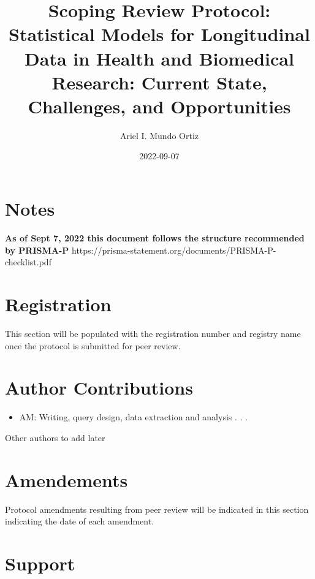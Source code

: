 \documentclass[
]{article}
\title{Scoping Review Protocol: Statistical Models for Longitudinal Data
in Health and Biomedical Research: Current State, Challenges, and
Opportunities}
\author{Ariel I. Mundo Ortiz}
\date{2022-09-07}
\providecommand{\tightlist}{%
  \setlength{\itemsep}{0pt}\setlength{\parskip}{0pt}}\usepackage{longtable,booktabs,array}
\renewcommand*\contentsname{Table of contents}
\newcommand\contentsname{Table of contents}
\begin{document}
\maketitle
\ifdefined\Shaded\renewenvironment{Shaded}{\begin{tcolorbox}[borderline west={3pt}{0pt}{shadecolor}, frame hidden, interior hidden, enhanced, breakable, sharp corners, boxrule=0pt]}{\end{tcolorbox}}\fi

\renewcommand*\contentsname{Table of contents}
{
\hypersetup{linkcolor=}
\setcounter{tocdepth}{3}
\tableofcontents
}
\hypertarget{notes}{%
\section{Notes}\label{notes}}

\textbf{As of Sept 7, 2022 this document follows the structure
recommended by PRISMA-P}
https://prisma-statement.org/documents/PRISMA-P-checklist.pdf

\hypertarget{registration}{%
\section{Registration}\label{registration}}

This section will be populated with the registration number and registry
name once the protocol is submitted for peer review.

\hypertarget{author-contributions}{%
\section{Author Contributions}\label{author-contributions}}

\begin{itemize}
\tightlist
\item
  AM: Writing, query design, data extraction and analysis . . .
\end{itemize}

Other authors to add later

\hypertarget{amendements}{%
\section{Amendements}\label{amendements}}

Protocol amendments resulting from peer review will be indicated in this
section indicating the date of each amendment.

\hypertarget{support}{%
\section{Support}\label{support}}
\end{document}
